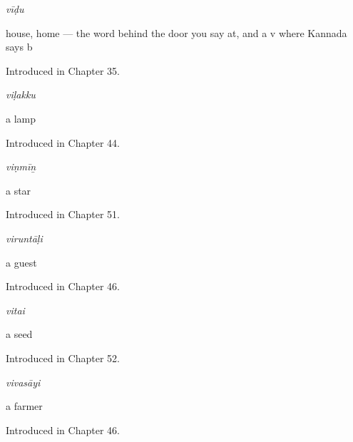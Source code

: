 \noindent\begin{minipage}[t]{\linewidth}
\raggedright
\textbf{}\enspace\emph{vīḍu}\par
\small house, home — the word behind the door you say  at, and a v where Kannada says b\par
\footnotesize Introduced in Chapter 35.
\end{minipage}\par\medskip

\noindent\begin{minipage}[t]{\linewidth}
\raggedright
\textbf{}\enspace\emph{viḷakku}\par
\small a lamp\par
\footnotesize Introduced in Chapter 44.
\end{minipage}\par\medskip

\noindent\begin{minipage}[t]{\linewidth}
\raggedright
\textbf{}\enspace\emph{viṇmīṉ}\par
\small a star\par
\footnotesize Introduced in Chapter 51.
\end{minipage}\par\medskip

\noindent\begin{minipage}[t]{\linewidth}
\raggedright
\textbf{}\enspace\emph{viruntāḷi}\par
\small a guest\par
\footnotesize Introduced in Chapter 46.
\end{minipage}\par\medskip

\noindent\begin{minipage}[t]{\linewidth}
\raggedright
\textbf{}\enspace\emph{vitai}\par
\small a seed\par
\footnotesize Introduced in Chapter 52.
\end{minipage}\par\medskip

\noindent\begin{minipage}[t]{\linewidth}
\raggedright
\textbf{}\enspace\emph{vivasāyi}\par
\small a farmer\par
\footnotesize Introduced in Chapter 46.
\end{minipage}\par\medskip

